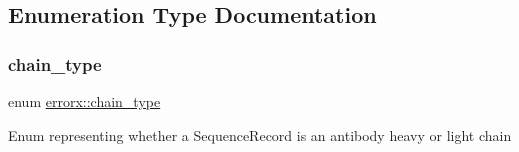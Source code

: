 \subsection{Enumeration Type Documentation}
\mbox{\label{_sequence_record_8hh_file_a7ec194f8987fd5aa3d34fb5921bff837}} 
\subsubsection{\texorpdfstring{chain\+\_\+type}{chain\_type}}
{\footnotesize\ttfamily enum \mbox{\hyperlink{_sequence_record_8hh_a7ec194f8987fd5aa3d34fb5921bff837}{errorx\+::chain\+\_\+type}}}

Enum representing whether a Sequence\+Record is an antibody heavy or light chain 